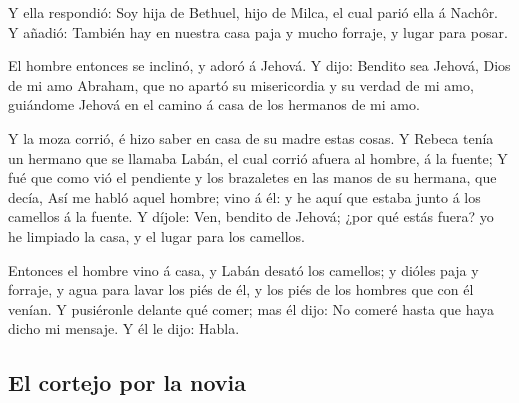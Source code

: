  Y ella respondió: Soy hija de Bethuel, hijo de Milca, el
cual parió ella á Nachôr.  Y añadió: También hay en
nuestra casa paja y mucho forraje, y lugar para posar.

 El hombre entonces se inclinó, y adoró á Jehová.
 Y dijo: Bendito sea Jehová, Dios de mi amo Abraham, que
no apartó su misericordia y su verdad de mi amo, guiándome Jehová en el
camino á casa de los hermanos de mi amo.

 Y la moza corrió, é hizo saber en casa de su madre estas
cosas.  Y Rebeca tenía un hermano que se llamaba Labán,
el cual corrió afuera al hombre, á la fuente;  Y fué que
como vió el pendiente y los brazaletes en las manos de su hermana, que
decía, Así me habló aquel hombre; vino á él: y he aquí que estaba junto
á los camellos á la fuente.  Y díjole: Ven, bendito de
Jehová; ¿por qué estás fuera? yo he limpiado la casa, y el lugar para
los camellos.

 Entonces el hombre vino á casa, y Labán desató los
camellos; y dióles paja y forraje, y agua para lavar los piés de él, y
los piés de los hombres que con él venían.  Y pusiéronle
delante qué comer; mas él dijo: No comeré hasta que haya dicho mi
mensaje. Y él le dijo: Habla.

\hypertarget{el-cortejo-por-la-novia}{%
\subsection{El cortejo por la novia}\label{el-cortejo-por-la-novia}}

